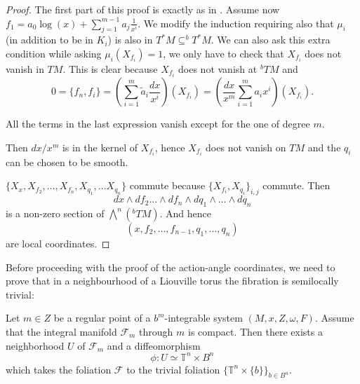 \begin{proof}
The first part of this proof is exactly as in \cite{KMS16}.
Assume now $\displaystyle f_1 = a_0\log(x) + \sum_{j=1}^{m-1}a_j\frac{1}{x^i}$.
We modify the induction requiring also that $\mu_i$ (in addition to be in $K_i$) is also in $T^* M \subseteq ^bT^* M$.
We can also ask this extra condition while asking $\mu_i(X_{f_i})= 1$, we only have to check that $X_{f_i}$ does not vanish in $TM$. This is clear because $X_{f_i}$ does not vanish at $^b TM$ and
$$0 = \{f_n,f_i\} = \left(\sum_{i=1}^m \tilde{a}_i\frac{dx}{x^i}\right)(X_{f_i}) = \left(\frac{dx}{x^m} \sum_{i=1}^{m}a_i x^i\right)(X_{f_i}).$$

All the terms in the last expression vanish except for the one of degree $m$.

Then $dx/x^m$ is in the kernel of $X_{f_i}$, hence $X_{f_i}$ does not vanish on $TM$ and the $q_i$ can be chosen to be smooth.

$\{X_x,X_{f_2},\ldots,X_{f_{n}},X_{q_1},\ldots X_{q_n}\}$ commute because $\{X_{f_i},X_{q_i}\}_{i,j}$ commute. Then
$$dx\wedge df_2\ldots\wedge df_n\wedge dq_1 \wedge \ldots \wedge d q_n$$
is a non-zero section of $\bigwedge^n(^b TM)$. And hence
$$(x,f_2,\ldots, f_{n-1},q_1,\ldots,q_n)$$
 are local coordinates.

\end{proof}

Before proceeding with the proof of the action-angle coordinates, we need to prove that in a neighbourhood of a Liouville torus the fibration is semilocally trivial:

\begin{lemma}\label{lemma:topological}
Let $m \in Z$ be a regular point of a $b^m$-integrable system $(M,x,Z,\omega,F)$. Assume that the integral manifold $\mathcal{F}_m$ through $m$ is compact. Then there exists a neighborhood $U$ of $\mathcal{F}_m$ and a diffeomorphism
$$\phi:U \simeq \mathbb{T}^n\times B^n$$
which takes the foliation $\mathcal{F}$ to the trivial foliation $\{\mathbb{T}^n\times\{b\}\}_{b\in B^n}$.
\end{lemma}

